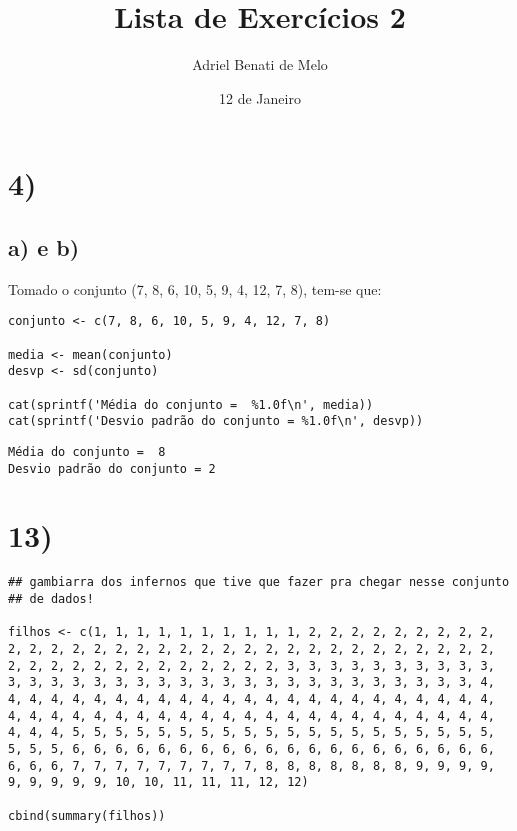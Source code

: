 \documentclass[11pt]{article}
\author{Adriel Benati de Melo}
\date{12 de Janeiro}
\title{Lista de Exercícios 2}
\begin{document}
\maketitle

\section*{4)}
\label{sec:org01ebfb3}

\subsection*{a) e b)}
\label{sec:org3e3a243}

Tomado o conjunto (7, 8, 6, 10, 5, 9, 4, 12, 7, 8), tem-se que:

\begin{verbatim}
conjunto <- c(7, 8, 6, 10, 5, 9, 4, 12, 7, 8)

media <- mean(conjunto)
desvp <- sd(conjunto)

cat(sprintf('Média do conjunto =  %1.0f\n', media))
cat(sprintf('Desvio padrão do conjunto = %1.0f\n', desvp))
\end{verbatim}

\begin{verbatim}
Média do conjunto =  8
Desvio padrão do conjunto = 2
\end{verbatim}

\section*{13)}
\label{sec:org1bec28c}

\begin{verbatim}
## gambiarra dos infernos que tive que fazer pra chegar nesse conjunto
## de dados!

filhos <- c(1, 1, 1, 1, 1, 1, 1, 1, 1, 1, 2, 2, 2, 2, 2, 2, 2, 2, 2,
2, 2, 2, 2, 2, 2, 2, 2, 2, 2, 2, 2, 2, 2, 2, 2, 2, 2, 2, 2, 2, 2, 2,
2, 2, 2, 2, 2, 2, 2, 2, 2, 2, 2, 2, 2, 3, 3, 3, 3, 3, 3, 3, 3, 3, 3,
3, 3, 3, 3, 3, 3, 3, 3, 3, 3, 3, 3, 3, 3, 3, 3, 3, 3, 3, 3, 3, 3, 4,
4, 4, 4, 4, 4, 4, 4, 4, 4, 4, 4, 4, 4, 4, 4, 4, 4, 4, 4, 4, 4, 4, 4,
4, 4, 4, 4, 4, 4, 4, 4, 4, 4, 4, 4, 4, 4, 4, 4, 4, 4, 4, 4, 4, 4, 4,
4, 4, 4, 5, 5, 5, 5, 5, 5, 5, 5, 5, 5, 5, 5, 5, 5, 5, 5, 5, 5, 5, 5,
5, 5, 5, 6, 6, 6, 6, 6, 6, 6, 6, 6, 6, 6, 6, 6, 6, 6, 6, 6, 6, 6, 6,
6, 6, 6, 7, 7, 7, 7, 7, 7, 7, 7, 7, 8, 8, 8, 8, 8, 8, 8, 9, 9, 9, 9,
9, 9, 9, 9, 9, 10, 10, 11, 11, 11, 12, 12)

cbind(summary(filhos))
\end{verbatim}
\end{document}
